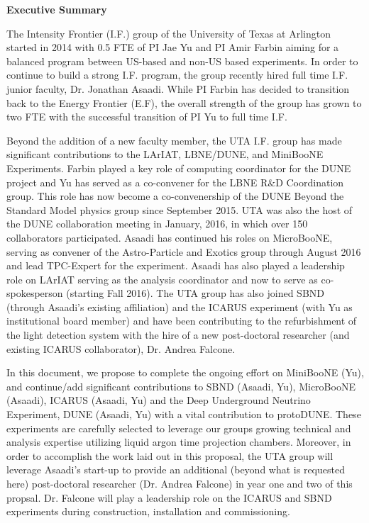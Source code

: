 \begin{center}
\textbf{ \Large{Executive Summary} }
\end{center}

The Intensity Frontier (I.F.) group of the University of Texas at Arlington started in 2014 with 0.5 FTE of PI Jae Yu and PI Amir Farbin aiming for a balanced program between US-based and non-US based experiments. In order to continue to build a strong I.F. program, the group recently hired full time I.F. junior faculty, Dr. Jonathan Asaadi. While PI Farbin has decided to transition back to the Energy Frontier (E.F), the overall strength of the group has grown to two FTE with the successful transition of PI Yu to full time I.F.

Beyond the addition of a new faculty member, the UTA I.F. group has made significant contributions to the LArIAT, LBNE/DUNE, and MiniBooNE Experiments. Farbin played a key role of computing coordinator for the DUNE project and Yu has served as a co-convener for the LBNE R$\&$D Coordination group. This role has now become a co-convenership of the DUNE Beyond the Standard Model physics group since September 2015. UTA was also the host of the DUNE collaboration meeting in January, 2016, in which over 150 collaborators participated. Asaadi has continued his roles on MicroBooNE, serving as convener of the Astro-Particle and Exotics group through August 2016 and lead TPC-Expert for the experiment. Asaadi has also played a leadership role on LArIAT serving as the analysis coordinator and now to serve as co-spokesperson (starting Fall 2016). The UTA group has also joined SBND (through Asaadi's existing affiliation) and the ICARUS experiment (with Yu as institutional board member) and have been contributing to the refurbishment of the light detection system with the hire of a new post-doctoral researcher (and existing ICARUS collaborator), Dr. Andrea Falcone.

In this document, we propose to complete the ongoing effort on MiniBooNE (Yu), and continue/add significant contributions to SBND (Asaadi, Yu), MicroBooNE (Asaadi), ICARUS (Asaadi, Yu) and the Deep Underground Neutrino Experiment, DUNE (Asaadi, Yu) with a vital contribution to protoDUNE. These experiments are carefully selected to leverage our groups growing technical and analysis expertise utilizing liquid argon time projection chambers. Moreover, in order to accomplish the work laid out in this proposal, the UTA group will leverage Asaadi's start-up to provide an additional (beyond what is requested here) post-doctoral researcher (Dr. Andrea Falcone) in year one and two of this propsal. Dr. Falcone will play a leadership role on the ICARUS and SBND experiments during construction, installation and commissioning.

